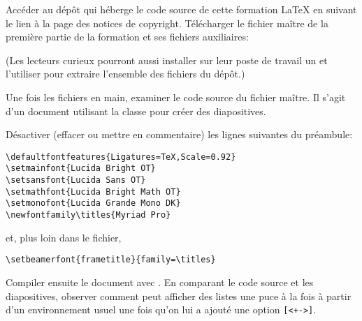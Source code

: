 \begin{exercice}[nosol]
  Accéder au dépôt qui héberge le code source de cette formation
  {\LaTeX} en suivant le lien à la page des notices de copyright.
  Télécharger le fichier maître de la première partie de la formation
  et ses fichiers auxiliaires:

  \medskip
  \begin{minipage}{\linewidth}
  \end{minipage}
  \medskip

  (Les lecteurs curieux pourront aussi installer sur leur poste de
  travail un %
  et l'utiliser pour extraire l'ensemble des fichiers du dépôt.)

  Une fois les fichiers en main, examiner le code source du fichier
  maître. Il s'agit d'un document utilisant la classe 
  pour créer des diapositives.

  Désactiver (effacer ou mettre en commentaire) les lignes suivantes
  du préambule:
\begin{lstlisting}
\defaultfontfeatures{Ligatures=TeX,Scale=0.92}
\setmainfont{Lucida Bright OT}
\setsansfont{Lucida Sans OT}
\setmathfont{Lucida Bright Math OT}
\setmonofont{Lucida Grande Mono DK}
\newfontfamily\titles{Myriad Pro}
\end{lstlisting}
  et, plus loin dans le fichier,
\begin{lstlisting}
\setbeamerfont{frametitle}{family=\titles}
\end{lstlisting}
  Compiler ensuite le document avec {\XeLaTeX}. En comparant le code
  source et les diapositives, observer comment  peut
  afficher des listes une puce à la fois à partir d'un environnement
   usuel une fois qu'on lui a ajouté une option
  \verb=[<+->]=.
\end{exercice}




